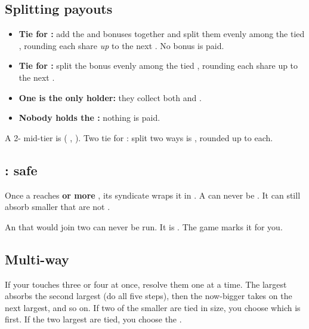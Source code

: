 \subsection{Splitting payouts}
\begin{itemize}
  \item \textbf{Tie for :} add the  and  bonuses together and split them evenly among the tied ,
    rounding each share \emph{up} to the next . No  bonus is paid.
  \item \textbf{Tie for :} split the  bonus evenly among the tied , rounding each share up to the next .
  \item \textbf{One  is the only holder:} they collect both  and .
  \item \textbf{Nobody holds the :} nothing is paid.
\end{itemize}

\begin{example}[: ROUNDING UP]
A 2- mid-tier  is  ( ,  ). Two  tie for :
 split two ways is , rounded up to  each.
\end{example}

\subsection{: safe }
Once a  reaches \textbf{ or more }, its syndicate wraps it in . A  
can never be . It can still absorb smaller  that are not .

An  that would join two   can never be run. It is . The game marks it for you.

\subsection{Multi-way }
If your  touches three or four  at once, resolve them one at a time. The largest  absorbs the second
largest (do all five steps), then the now-bigger  takes on the next largest, and so on. If two of the smaller
 are tied in size, you choose which is  first. If the two largest are tied, you choose the .

